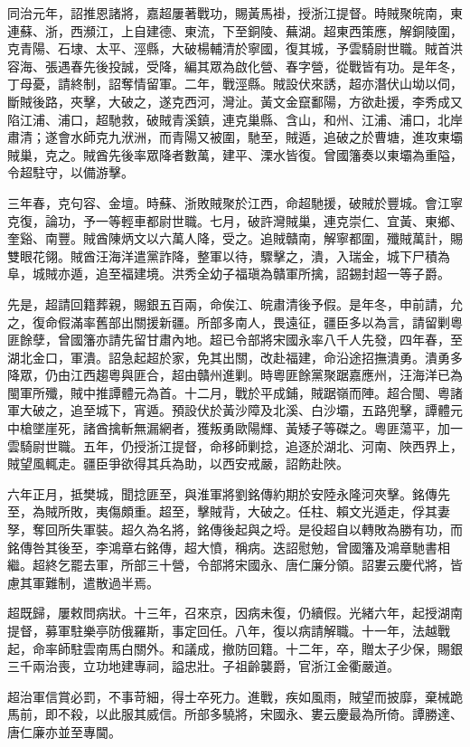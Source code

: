\begin{pinyinscope}
同治元年，詔推恩諸將，嘉超屢著戰功，賜黃馬褂，授浙江提督。時賊聚皖南，東連蘇、浙，西瀕江，上自建德、東流，下至銅陵、蕪湖。超東西策應，解銅陵圍，克青陽、石埭、太平、涇縣，大破楊輔清於寧國，復其城，予雲騎尉世職。賊首洪容海、張遇春先後投誠，受降，編其眾為啟化營、春字營，從戰皆有功。是年冬，丁母憂，請終制，詔奪情留軍。二年，戰涇縣。賊設伏來誘，超亦潛伏山坳以伺，斷賊後路，夾擊，大破之，遂克西河，灣沚。黃文金竄鄱陽，方欲赴援，李秀成又陷江浦、浦口，超馳救，破賊青溪鎮，連克巢縣、含山，和州、江浦、浦口，北岸肅清；遂會水師克九洑洲，而青陽又被圍，馳至，賊遁，追破之於曹塘，進攻東壩賊巢，克之。賊酋先後率眾降者數萬，建平、溧水皆復。曾國籓奏以東壩為重隘，令超駐守，以備游擊。

三年春，克句容、金壇。時蘇、浙敗賊聚於江西，命超馳援，破賊於豐城。會江寧克復，論功，予一等輕車都尉世職。七月，破許灣賊巢，連克崇仁、宜黃、東鄉、奎谿、南豐。賊酋陳炳文以六萬人降，受之。追賊贛南，解寧都圍，殲賊萬計，賜雙眼花翎。賊酋汪海洋遣黨詐降，整軍以待，驟擊之，潰，入瑞金，城下尸積為阜，城賊亦遁，追至福建境。洪秀全幼子福瑱為贛軍所擒，詔錫封超一等子爵。

先是，超請回籍葬親，賜銀五百兩，命俟江、皖肅清後予假。是年冬，申前請，允之，復命假滿率舊部出關援新疆。所部多南人，畏遠征，疆臣多以為言，請留剿粵匪餘孽，曾國籓亦請先留甘肅內地。超已令部將宋國永率八千人先發，四年春，至湖北金口，軍潰。詔急起超於家，免其出關，改赴福建，命沿途招撫潰勇。潰勇多降眾，仍由江西趨粵與匪合，超由贛州進剿。時粵匪餘黨聚踞嘉應州，汪海洋已為閩軍所殲，賊中推譚體元為首。十二月，戰於平成鋪，賊踞嶺而陣。超合閩、粵諸軍大破之，追至城下，宵遁。預設伏於黃沙障及北溪、白沙壩，五路兜擊，譚體元中槍墜崖死，諸酋擒斬無漏網者，獲叛勇歐陽輝、黃矮子等磔之。粵匪蕩平，加一雲騎尉世職。五年，仍授浙江提督，命移師剿捻，追逐於湖北、河南、陜西界上，賊望風輒走。疆臣爭欲得其兵為助，以西安戒嚴，詔飭赴陜。

六年正月，抵樊城，聞捻匪至，與淮軍將劉銘傳約期於安陸永隆河夾擊。銘傳先至，為賊所敗，夷傷頗重。超至，擊賊背，大破之。任柱、賴文光遁走，俘其妻孥，奪回所失軍裝。超久為名將，銘傳後起與之埒。是役超自以轉敗為勝有功，而銘傳咎其後至，李鴻章右銘傳，超大憤，稱病。迭詔慰勉，曾國籓及鴻章馳書相繼。超終乞罷去軍，所部三十營，令部將宋國永、唐仁廉分領。詔婁云慶代將，皆慮其軍難制，遣散過半焉。

超既歸，屢敕問病狀。十三年，召來京，因病未復，仍續假。光緒六年，起授湖南提督，募軍駐樂亭防俄羅斯，事定回任。八年，復以病請解職。十一年，法越戰起，命率師駐雲南馬白關外。和議成，撤防回籍。十二年，卒，贈太子少保，賜銀三千兩治喪，立功地建專祠，謚忠壯。子祖齡襲爵，官浙江金衢嚴道。

超治軍信賞必罰，不事苛細，得士卒死力。進戰，疾如風雨，賊望而披靡，棄械跪馬前，即不殺，以此服其威信。所部多驍將，宋國永、婁云慶最為所倚。譚勝達、唐仁廉亦並至專閫。


\end{pinyinscope}
